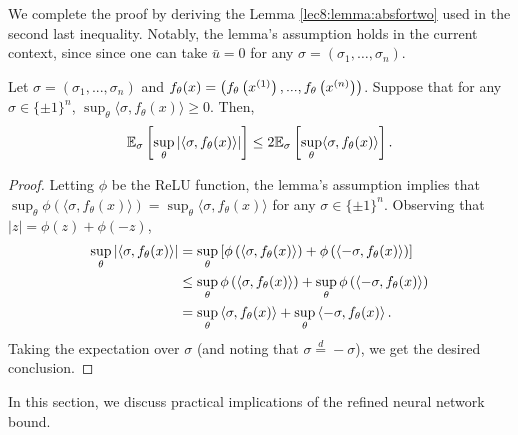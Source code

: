 We complete the proof by deriving the Lemma \ref{lec8:lemma:absfortwo} used in the second last inequality. Notably, the lemma's assumption holds in the current context, since
since one can take $\bar{u} = 0$ for any $\sigma = (\sigma_1, \dots, \sigma_n)$.

\begin{lemma}\label{lec8:lemma:absfortwo}
Let $\sigma = (\sigma_1, ..., \sigma_n)$ and $f_{\theta}(x) = \left(f_{\theta}\left(x^{(1)}\right), ...,  f_{\theta}\left(x^{(n)} \right)\right)$. Suppose that for any $\sigma \in \{\pm 1\}^n$, $\sup_{\theta} \langle \sigma, f_{\theta}(x) \rangle \geq 0$. Then, 
\begin{equation}
\mathbb{E}_{\sigma}\left[ \sup_{\theta}  \left | \langle \sigma, f_{\theta}(x) \rangle \right|  \right] \leq 2 \mathbb{E}_{\sigma}\left[ \sup_{\theta}  \langle \sigma, f_{\theta}(x) \rangle   \right].
\end{equation}
\end{lemma}

\begin{proof}
Letting $\phi$ be the ReLU function, the lemma's assumption implies that $\sup_{\theta} \phi\left(\langle \sigma, f_{\theta}(x) \rangle\right) = \sup_{\theta}\langle \sigma, f_{\theta}(x) \rangle$ for any $\sigma \in \{\pm 1\}^n$. Observing that $|z| = \phi(z) + \phi(-z)$, 
\begin{align}
\sup_{\theta} \abs{\inprod{ \sigma, f_{\theta}(x) }}%
&= \sup_{\theta} \left[ \phi \l(\inprod{ \sigma, f_{\theta}(x) } \r) + \phi \l(\inprod{-\sigma, f_{\theta}(x) } \r)\right] \\
&\le \sup_{\theta}  \phi \l(\inprod{ \sigma, f_{\theta}(x) } \r) +  \sup_{\theta}  \phi \l(\inprod{-\sigma, f_{\theta}(x) } \r)  \\
&= \sup_{\theta} \inprod{ \sigma, f_{\theta}(x) } +  \sup_{\theta}  \inprod{-\sigma, f_{\theta}(x) }. 
\end{align}
Taking the expectation over $\sigma$ (and noting that $\sigma \overset d = -\sigma$), we get the desired conclusion.
\end{proof}



In this section, we discuss practical implications of the refined neural network bound. 

\label{sec:gen-bounds:impliciation}

